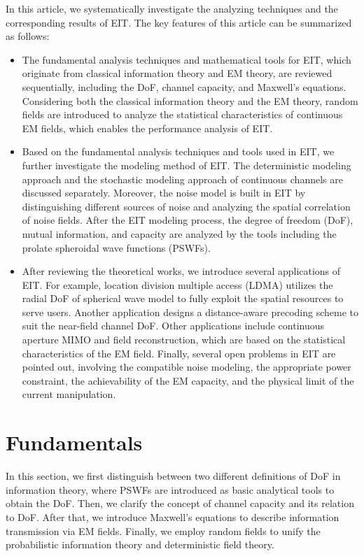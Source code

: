 \documentclass[journal,twocolumn]{IEEEtran}
\begin{document}
In this article, we systematically investigate the analyzing techniques and the corresponding results of EIT. The key features of this article can be summarized as follows:
\begin{itemize}
\item{The fundamental analysis techniques and mathematical tools for EIT, which originate from classical information theory and EM theory, are reviewed sequentially, including the DoF, channel capacity, and Maxwell's equations. Considering both the classical information theory and the EM theory, random fields are introduced to analyze the statistical characteristics of continuous EM fields, which enables the performance analysis of EIT. }
\item{Based on the fundamental analysis techniques and tools used in EIT, we further investigate the modeling method of EIT. The deterministic modeling approach and the stochastic modeling approach of continuous channels are discussed separately. Moreover, the noise model is built in EIT by distinguishing different sources of noise and analyzing the spatial correlation of noise fields. After the EIT modeling process, the degree of freedom (DoF), mutual information, and capacity are analyzed by the tools including the prolate spheroidal wave functions (PSWFs).} 
\item{After reviewing the theoretical works, we introduce several applications of EIT. For example, location division multiple access (LDMA) utilizes the radial DoF of spherical wave model to fully exploit the spatial resources to serve users. Another application designs a distance-aware precoding scheme to suit the near-field channel DoF. Other applications include continuous aperture MIMO and field reconstruction, which are based on the statistical characteristics of the EM field. Finally, several open problems in EIT are pointed out, involving the compatible noise modeling, the appropriate power constraint, the achievability of the EM capacity, and the physical limit of the current manipulation.}
\end{itemize}

\section{Fundamentals}
In this section, we first distinguish between two different definitions of DoF in information theory, where PSWFs are introduced as basic analytical tools to obtain the DoF. 
Then, we clarify the concept of channel capacity and its relation to DoF. 
After that, we introduce Maxwell's equations to describe information transmission via EM fields. 
Finally, we employ random fields to unify the probabilistic information theory and deterministic field theory. 
\end{document}
